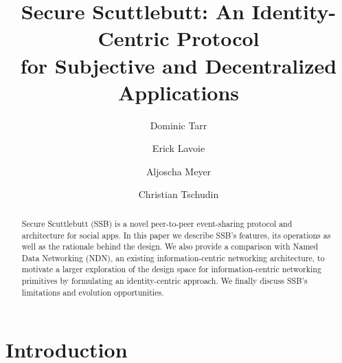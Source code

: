 \documentclass[9pt,sigconf]{acmart}
\title[Secure Scuttlebutt: An Identity-Centric Protocol
       for Subjective and Decentralized Applications]{%
  Secure Scuttlebutt: An Identity-Centric Protocol \\
  for Subjective and Decentralized Applications
}
\author{Dominic Tarr}
\affiliation{ssb:@EMovhfIrFk4NihAKnRNhrf}
\author{Erick Lavoie}
\affiliation{McGill University, Montreal, Canada}
\author{Aljoscha Meyer}
\affiliation{TU Berlin, Germany}
\author{Christian Tschudin}
\affiliation{University of Basel, Switzerland}
\begin{document}

\begin{abstract}
  Secure Scuttlebutt (SSB) is a novel peer-to-peer
  event-sharing protocol and architecture for social apps. In this
  paper we describe SSB's features, its operations as well as the
  rationale behind the design. We also provide a comparison with Named
  Data Networking (NDN), an existing information-centric networking
  architecture, to motivate a larger exploration of the design space
  for information-centric networking primitives by formulating an
  identity-centric approach. We finally discuss SSB's limitations
  and evolution opportunities.


\end{abstract}


\maketitle


\section{Introduction}
\end{document}
